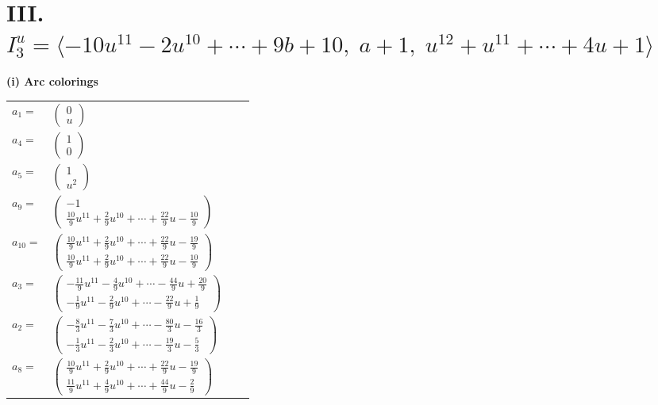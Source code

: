 \documentclass[1p]{elsarticle_modified}
\theoremstyle{definition}
\begin{document}
\centering \section*{III. $I^u_{3}= \langle -10 u^{11}-2 u^{10}+\cdots+9 b+10,\;a+1,\;u^{12}+u^{11}+\cdots+4 u+1 \rangle$}
\flushleft \textbf{(i) Arc colorings}\\
\begin{tabular}{m{7pt} m{180pt} m{7pt} m{180pt} }
\flushright $a_{1}=$&$\begin{pmatrix}0\\u\end{pmatrix}$ \\
\flushright $a_{4}=$&$\begin{pmatrix}1\\0\end{pmatrix}$ \\
\flushright $a_{5}=$&$\begin{pmatrix}1\\u^2\end{pmatrix}$ \\
\flushright $a_{9}=$&$\begin{pmatrix}-1\\\frac{10}{9} u^{11}+\frac{2}{9} u^{10}+\cdots+\frac{22}{9} u-\frac{10}{9}\end{pmatrix}$ \\
\flushright $a_{10}=$&$\begin{pmatrix}\frac{10}{9} u^{11}+\frac{2}{9} u^{10}+\cdots+\frac{22}{9} u-\frac{19}{9}\\\frac{10}{9} u^{11}+\frac{2}{9} u^{10}+\cdots+\frac{22}{9} u-\frac{10}{9}\end{pmatrix}$ \\
\flushright $a_{3}=$&$\begin{pmatrix}-\frac{11}{9} u^{11}-\frac{4}{9} u^{10}+\cdots-\frac{44}{9} u+\frac{20}{9}\\-\frac{1}{9} u^{11}-\frac{2}{9} u^{10}+\cdots-\frac{22}{9} u+\frac{1}{9}\end{pmatrix}$ \\
\flushright $a_{2}=$&$\begin{pmatrix}-\frac{8}{3} u^{11}-\frac{7}{3} u^{10}+\cdots-\frac{80}{3} u-\frac{16}{3}\\-\frac{1}{3} u^{11}-\frac{2}{3} u^{10}+\cdots-\frac{19}{3} u-\frac{5}{3}\end{pmatrix}$ \\
\flushright $a_{8}=$&$\begin{pmatrix}\frac{10}{9} u^{11}+\frac{2}{9} u^{10}+\cdots+\frac{22}{9} u-\frac{19}{9}\\\frac{11}{9} u^{11}+\frac{4}{9} u^{10}+\cdots+\frac{44}{9} u-\frac{2}{9}\end{pmatrix}$ \\

\end{tabular}
\end{document}

